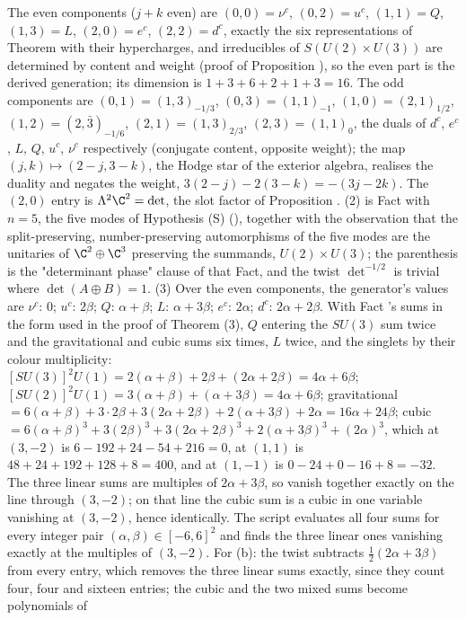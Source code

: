 The even components ($j + k$ even) are $(0,0) = \nu^{c}$, $(0,2) = u^{c}$, $(1,1) = Q$, $(1,3) = L$, $(2,0) = e^{c}$, $(2,2) = d^{c}$, exactly the six representations of Theorem  with their hypercharges, and irreducibles of $S(U(2) \times U(3))$ are determined by content and weight (proof of Proposition ), so the even part is the derived generation; its dimension is $1 + 3 + 6 + 2 + 1 + 3 = 16$. The odd components are $(0,1) = (1,3)_{-1/3}$, $(0,3) = (1,1)_{-1}$, $(1,0) = (2,1)_{1/2}$, $(1,2) = (2,\bar{3})_{-1/6}$, $(2,1) = (1,3)_{2/3}$, $(2,3) = (1,1)_{0}$, the duals of $d^{c}$, $e^{c}$, $L$, $Q$, $u^{c}$, $\nu^{c}$ respectively (conjugate content, opposite weight); the map $(j, k) \mapsto (2 - j, 3 - k)$, the Hodge star of the exterior algebra, realises the duality and negates the weight, $3(2-j) - 2(3-k) = -(3j - 2k)$. The $(2,0)$ entry is $\Lambda^{2}\C^{2} = \det$, the slot factor of Proposition . (2) is Fact  with $n = 5$, the five modes of Hypothesis (S) (), together with the observation that the split-preserving, number-preserving automorphisms of the five modes are the unitaries of $\C^{2} \oplus \C^{3}$ preserving the summands, $U(2) \times U(3)$; the parenthesis is the "determinant phase" clause of that Fact, and the twist $\det^{-1/2}$ is trivial where $\det(A \oplus B) = 1$. (3) Over the even components, the generator's values are $\nu^{c}$: $0$; $u^{c}$: $2\beta$; $Q$: $\alpha + \beta$; $L$: $\alpha + 3\beta$; $e^{c}$: $2\alpha$; $d^{c}$: $2\alpha + 2\beta$. With Fact 's sums in the form used in the proof of Theorem (3), $Q$ entering the $SU(3)$ sum twice and the gravitational and cubic sums six times, $L$ twice, and the singlets by their colour multiplicity: $[SU(3)]^{2}U(1) = 2(\alpha + \beta) + 2\beta + (2\alpha + 2\beta) = 4\alpha + 6\beta$; $[SU(2)]^{2}U(1) = 3(\alpha + \beta) + (\alpha + 3\beta) = 4\alpha + 6\beta$; gravitational $= 6(\alpha + \beta) + 3 \cdot 2\beta + 3(2\alpha + 2\beta) + 2(\alpha + 3\beta) + 2\alpha = 16\alpha + 24\beta$; cubic $= 6(\alpha + \beta)^{3} + 3(2\beta)^{3} + 3(2\alpha + 2\beta)^{3} + 2(\alpha + 3\beta)^{3} + (2\alpha)^{3}$, which at $(3, -2)$ is $6 - 192 + 24 - 54 + 216 = 0$, at $(1, 1)$ is $48 + 24 + 192 + 128 + 8 = 400$, and at $(1, -1)$ is $0 - 24 + 0 - 16 + 8 = -32$. The three linear sums are multiples of $2\alpha + 3\beta$, so vanish together exactly on the line through $(3,-2)$; on that line the cubic sum is a cubic in one variable vanishing at $(3,-2)$, hence identically. The script evaluates all four sums for every integer pair $(\alpha, \beta) \in [-6, 6]^{2}$ and finds the three linear ones vanishing exactly at the multiples of $(3, -2)$. For (b): the twist subtracts $\tfrac12(2\alpha + 3\beta)$ from every entry, which removes the three linear sums exactly, since they count four, four and sixteen entries; the cubic and the two mixed sums become polynomials of 